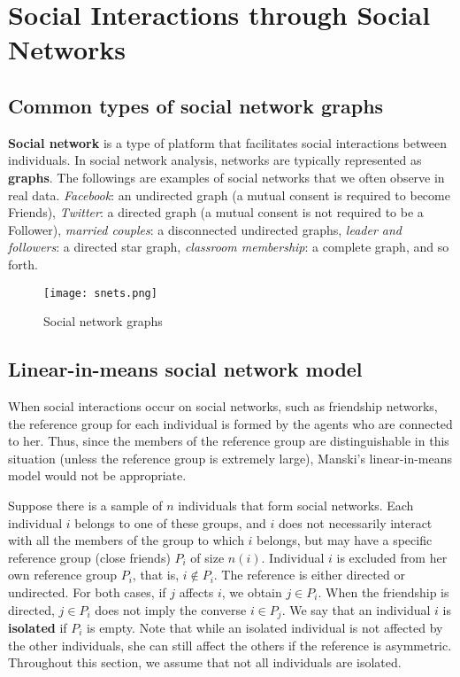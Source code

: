 \documentclass[11pt, A4paper, openany, uplatex]{book}
\begin{document}


\chapter{Social Interactions through Social Networks}\label{chap:social_network}
\section{Common types of social network graphs}

\textbf{Social network} is a type of platform that facilitates social interactions between individuals. 
In social network analysis, networks are typically represented as \textbf{graphs}.
The followings are examples of social networks that we often observe in real data.
\textit{Facebook}: an undirected graph (a mutual consent is required to become Friends), \textit{Twitter}: a directed graph (a mutual consent is not required to be a Follower), \textit{married couples}: a disconnected undirected graphs, \textit{leader and followers}: a directed star graph, \textit{classroom membership}: a complete graph, and so forth.

\begin{figure}[h!]
	\begin{center}
		\texttt{[image: snets.png]}
		\caption{Social network graphs}
	\end{center}
\end{figure}

\section{Linear-in-means social network model}

When social interactions occur on social networks, such as friendship networks, the reference group for each individual is formed by the agents who are connected to her.
Thus, since the members of the reference group are distinguishable in this situation (unless the reference group is extremely large), Manski's linear-in-means model would not be appropriate.

Suppose there is a sample of $n$ individuals that form social networks.
Each individual $i$ belongs to one of these  groups, and $i$ does not necessarily interact with all the members of the group to which $i$ belongs, but may have a specific reference group (close friends) $P_i$ of size $n(i)$. 
Individual $i$ is excluded from her own reference group $P_i$, that is, $ i \not\in P_i$.
The reference is either directed  or undirected. 
For both cases, if $j$ affects $i$, we obtain $j \in P_i$.
When the friendship is directed, $j \in P_i$ does not imply the converse $i \in P_j $.
We say that an individual $i$ is \textbf{isolated} if $P_i$ is empty. 
Note that while an isolated individual is not affected by the other individuals, she can still affect the others if the reference is asymmetric.
Throughout this section, we assume that not all individuals are isolated. 
\end{document}
